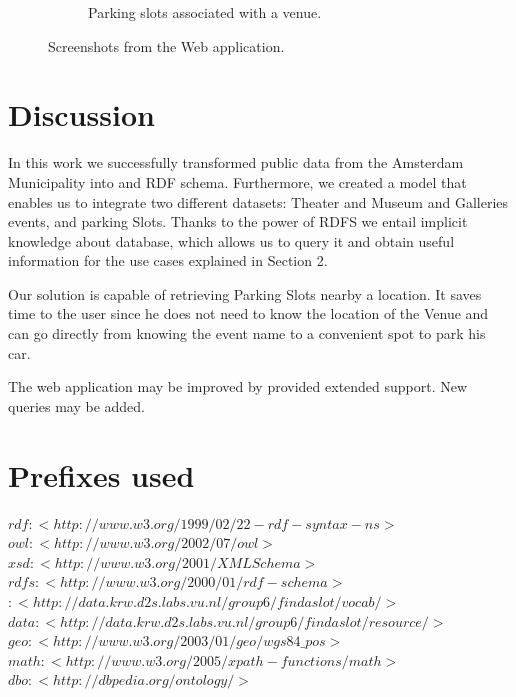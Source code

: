 \documentclass[runningheads,a4paper]{../../StyleFiles/llncs}
\begin{document}
\begin{figure}
\begin{subfigure}[b]{.4\textwidth}
		\caption{Parking slots associated with a venue.}
		\label{fig:app-slots}
	\end{subfigure}
	\caption{Screenshots from the Web application.}
	\label{fig:app}
\end{figure}

\section{Discussion}
In this work we successfully transformed public data from the Amsterdam Municipality into and RDF schema. Furthermore, we created a model that enables us to integrate two different datasets: Theater and Museum and Galleries events, and parking Slots. Thanks to the power of RDFS we entail implicit knowledge about database, which allows us to query it and obtain useful information for the use cases explained in Section 2. 

Our solution is capable of retrieving Parking Slots nearby a location. It saves time to the user since he does not need to know the location of the Venue and can go directly from knowing the event name to a convenient spot to park his car. 

The web application may be improved by provided extended support. New queries may be added. %





\newpage
\appendix
\section{Prefixes used}

$rdf: <http://www.w3.org/1999/02/22-rdf-syntax-ns>$ \\
$owl: <http://www.w3.org/2002/07/owl>$ \\
$xsd: <http://www.w3.org/2001/XMLSchema>$ \\
$rdfs: <http://www.w3.org/2000/01/rdf-schema>$ \\
$: <http://data.krw.d2s.labs.vu.nl/group6/findaslot/vocab/>$ \\
$data: <http://data.krw.d2s.labs.vu.nl/group6/findaslot/resource/>$ \\
$geo: <http://www.w3.org/2003/01/geo/wgs84\_pos>$ \\
$math: <http://www.w3.org/2005/xpath-functions/math>$ \\
$dbo: <http://dbpedia.org/ontology/>$
\end{document}
